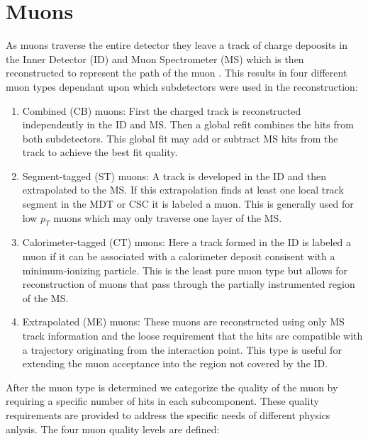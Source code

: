 \section{Muons} \label{sec:objects:muons}

As muons traverse the entire detector they leave a track of charge depoosits in
the Inner Detector (ID) and Muon Spectrometer (MS) which is then reconstructed to
represent the path of the muon \cite{Aad:2016jkr}. This results in four
different muon types dependant upon which subdetectors were used in the
reconstruction:

\begin{enumerate}
  \item Combined (CB) muons: First the charged track is reconstructed independently in the ID and MS.  Then a global refit combines the hits from both subdetectors. This global fit may add or subtract MS hits from the track to achieve the best fit quality.
  \item Segment-tagged (ST) muons: A track is developed in the ID and then extrapolated to the MS.  If this extrapolation finds at least one local track segment in the MDT or CSC it is labeled a muon.  This is generally used for low $p_{T}$ muons which may only traverse one layer of the MS.
  \item Calorimeter-tagged (CT) muons: Here a track formed in the ID is labeled a muon if it can be associated with a calorimeter deposit consisent with a minimum-ionizing particle.  This is the least pure muon type but allows for reconstruction of muons that pass through the partially instrumented region of the MS.
  \item Extrapolated (ME) muons: These muons are reconstructed using only MS track information and the loose requirement that the hits are compatible with a trajectory originating from the interaction point.  This type is useful for extending the muon acceptance into the region not covered by the ID.
\end{enumerate}

After the muon type is determined we categorize the quality of the muon by
requiring a specific number of hits in each subcomponent.  These quality requirements are provided to address the specific needs of different physics anlysis. The four muon quality levels are defined:

